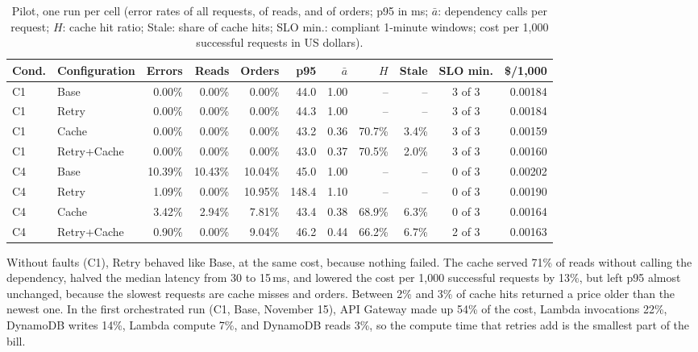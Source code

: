 \documentclass[10pt]{article}
\begin{document}
\begin{table}[htbp]
\centering
\footnotesize
\begin{tabular}{@{}llrrrrrrrcr@{}}
\toprule
\textbf{Cond.} & \textbf{Configuration} & \textbf{Errors} & \textbf{Reads} & \textbf{Orders}
  & \textbf{p95} & $\bar{a}$ & $H$ & \textbf{Stale} & \textbf{SLO min.} & \textbf{\$/1{,}000} \\
\midrule
C1 & Base        & 0.00\%  & 0.00\%  & 0.00\%  & 44.0  & 1.00 & --     & --    & 3 of 3 & 0.00184 \\
C1 & Retry       & 0.00\%  & 0.00\%  & 0.00\%  & 44.3  & 1.00 & --     & --    & 3 of 3 & 0.00184 \\
C1 & Cache       & 0.00\%  & 0.00\%  & 0.00\%  & 43.2  & 0.36 & 70.7\% & 3.4\% & 3 of 3 & 0.00159 \\
C1 & Retry+Cache & 0.00\%  & 0.00\%  & 0.00\%  & 43.0  & 0.37 & 70.5\% & 2.0\% & 3 of 3 & 0.00160 \\
\midrule
C4 & Base        & 10.39\% & 10.43\% & 10.04\% & 45.0  & 1.00 & --     & --    & 0 of 3 & 0.00202 \\
C4 & Retry       & 1.09\%  & 0.00\%  & 10.95\% & 148.4 & 1.10 & --     & --    & 0 of 3 & 0.00190 \\
C4 & Cache       & 3.42\%  & 2.94\%  & 7.81\%  & 43.4  & 0.38 & 68.9\% & 6.3\% & 0 of 3 & 0.00164 \\
C4 & Retry+Cache & 0.90\%  & 0.00\%  & 9.04\%  & 46.2  & 0.44 & 66.2\% & 6.7\% & 2 of 3 & 0.00163 \\
\bottomrule
\end{tabular}
\caption{Pilot, one run per cell (error rates of all requests, of reads, and of
orders; p95 in ms; $\bar{a}$: dependency calls per request; $H$: cache hit
ratio; Stale: share of cache hits; SLO min.: compliant 1-minute windows; cost
per 1{,}000 successful requests in US dollars).}
\label{tab:pilot}
\end{table}

Without faults (C1), Retry behaved like Base, at the same cost, because nothing
failed. The cache served 71\% of reads without calling the dependency, halved
the median latency from 30 to 15\,ms, and lowered the cost per 1{,}000
successful requests by 13\%, but left p95 almost unchanged, because the slowest
requests are cache misses and orders. Between 2\% and 3\% of cache hits
returned a price older than the newest one. In the first orchestrated run (C1,
Base, November 15), API Gateway made up 54\% of the cost, Lambda invocations
22\%, DynamoDB writes 14\%, Lambda compute 7\%, and DynamoDB reads 3\%, so the
compute time that retries add is the smallest part of the bill.
\end{document}
